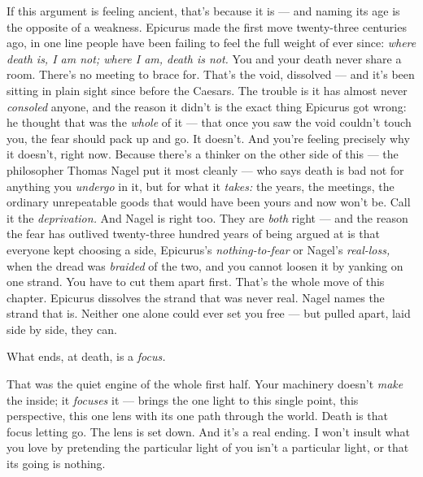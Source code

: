 \documentclass[11pt,openany]{book}
\begin{document}
If this argument is feeling ancient, that’s because it is — and naming its age is the opposite of a weakness. Epicurus made the first move twenty-three centuries ago, in one line people have been failing to feel the full weight of ever since: \textit{where death is, I am not; where I am, death is not.} You and your death never share a room. There’s no meeting to brace for. That’s the void, dissolved — and it’s been sitting in plain sight since before the Caesars. The trouble is it has almost never \textit{consoled} anyone, and the reason it didn’t is the exact thing Epicurus got wrong: he thought that was the \textit{whole} of it — that once you saw the void couldn’t touch you, the fear should pack up and go. It doesn’t. And you’re feeling precisely why it doesn’t, right now. Because there’s a thinker on the other side of this — the philosopher Thomas Nagel put it most cleanly — who says death is bad not for anything you \textit{undergo} in it, but for what it \textit{takes:} the years, the meetings, the ordinary unrepeatable goods that would have been yours and now won’t be. Call it the \textit{deprivation.} And Nagel is right too. They are \textit{both} right — and the reason the fear has outlived twenty-three hundred years of being argued at is that everyone kept choosing a side, Epicurus’s \textit{nothing-to-fear} or Nagel’s \textit{real-loss,} when the dread was \textit{braided} of the two, and you cannot loosen it by yanking on one strand. You have to cut them apart first. That’s the whole move of this chapter. Epicurus dissolves the strand that was never real. Nagel names the strand that is. Neither one alone could ever set you free — but pulled apart, laid side by side, they can.

What ends, at death, is a \textit{focus.}

That was the quiet engine of the whole first half. Your machinery doesn’t \textit{make} the inside; it \textit{focuses} it — brings the one light to this single point, this perspective, this one lens with its one path through the world. Death is that focus letting go. The lens is set down. And it’s a real ending. I won’t insult what you love by pretending the particular light of you isn’t a particular light, or that its going is nothing.
\end{document}
